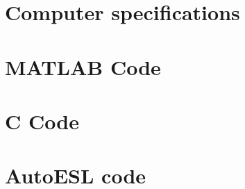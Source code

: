 \appendix

\chapter{Computer specifications}
\label{apdx:computerSpecifications}


\chapter{MATLAB Code}
\label{apdx:matlabCode}


\chapter{C Code}
\label{apdx:cCode}


\chapter{AutoESL code}
\label{apdx:autoeslCode}

